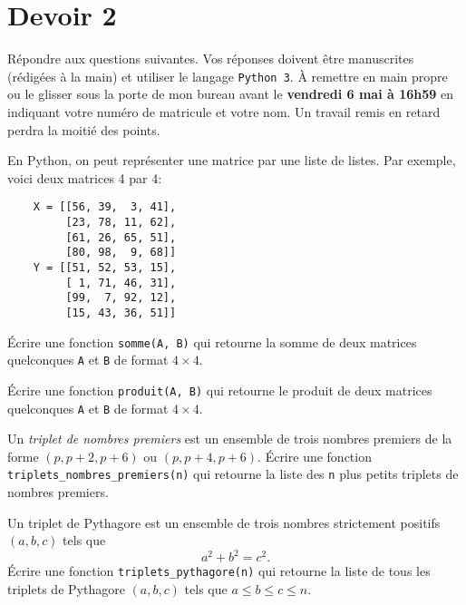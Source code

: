 



\section*{Devoir 2}

Répondre aux questions suivantes. Vos réponses doivent être manuscrites
(rédigées à la main) et utiliser le langage \texttt{Python 3}.
À remettre en main propre ou le glisser sous la porte de mon bureau avant le
\textbf{vendredi 6 mai à 16h59} 
en indiquant votre numéro de matricule et votre nom. Un travail remis en
retard perdra la moitié des points.

\begin{question}[5 pts]
    En Python, on peut représenter une matrice par une liste de listes. Par
    exemple, voici deux matrices 4 par 4:
    \begin{verbatim}
    X = [[56, 39,  3, 41],
         [23, 78, 11, 62],
         [61, 26, 65, 51],
         [80, 98,  9, 68]]
    Y = [[51, 52, 53, 15],
         [ 1, 71, 46, 31],
         [99,  7, 92, 12],
         [15, 43, 36, 51]]
    \end{verbatim}
    \vspace{-1em}
    Écrire une fonction \texttt{somme(A, B)} qui retourne la somme de deux
    matrices quelconques \texttt{A} et \texttt{B} de format $4\times 4$.
\end{question}

\begin{question}[5 pts]
    Écrire une fonction \texttt{produit(A, B)} qui retourne le produit de deux
    matrices quelconques \texttt{A} et \texttt{B} de format $4\times 4$.
\end{question}

\begin{question}[5 pts]
    Un \emph{triplet de nombres premiers} est un ensemble de trois nombres
    premiers de la forme $(p, p + 2, p + 6)$ ou $(p, p + 4, p + 6)$.
    Écrire une fonction \texttt{triplets\_nombres\_premiers(n)} qui retourne
    la liste des \texttt{n} plus petits triplets de nombres premiers.
\end{question}

\begin{question}[5 pts]
    Un triplet de Pythagore est un ensemble de trois nombres strictement
    positifs $(a,b,c)$ tels que 
    \[
	a^2+b^2=c^2.
    \]
    Écrire une fonction
    \texttt{triplets\_pythagore(n)} qui retourne la liste de tous les triplets
    de Pythagore $(a,b,c)$ tels que $a\leq b\leq c\leq n$.
\end{question}



